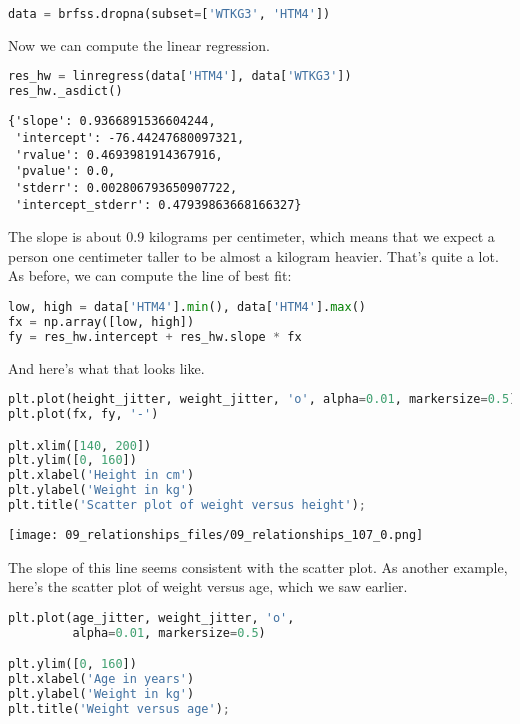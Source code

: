 \begin{lstlisting}[language=Python,style=source]
data = brfss.dropna(subset=['WTKG3', 'HTM4'])
\end{lstlisting}

Now we can compute the linear regression.

\begin{lstlisting}[language=Python,style=source]
res_hw = linregress(data['HTM4'], data['WTKG3'])
res_hw._asdict()
\end{lstlisting}

\begin{lstlisting}[style=output]
{'slope': 0.9366891536604244,
 'intercept': -76.44247680097321,
 'rvalue': 0.4693981914367916,
 'pvalue': 0.0,
 'stderr': 0.002806793650907722,
 'intercept_stderr': 0.47939863668166327}
\end{lstlisting}

The slope is about 0.9 kilograms per centimeter, which means that we
expect a person one centimeter taller to be almost a kilogram heavier.
That's quite a lot. As before, we can compute the line of best fit:

\begin{lstlisting}[language=Python,style=source]
low, high = data['HTM4'].min(), data['HTM4'].max()
fx = np.array([low, high])
fy = res_hw.intercept + res_hw.slope * fx
\end{lstlisting}

And here's what that looks like.

\begin{lstlisting}[language=Python,style=source]
plt.plot(height_jitter, weight_jitter, 'o', alpha=0.01, markersize=0.5)
plt.plot(fx, fy, '-')

plt.xlim([140, 200])
plt.ylim([0, 160])
plt.xlabel('Height in cm')
plt.ylabel('Weight in kg')
plt.title('Scatter plot of weight versus height');
\end{lstlisting}

\begin{center}
\texttt{[image: 09\_relationships\_files/09\_relationships\_107\_0.png]}
\end{center}

The slope of this line seems consistent with the scatter plot. As
another example, here's the scatter plot of weight versus age, which we
saw earlier.

\begin{lstlisting}[language=Python,style=source]
plt.plot(age_jitter, weight_jitter, 'o',
         alpha=0.01, markersize=0.5)

plt.ylim([0, 160])
plt.xlabel('Age in years')
plt.ylabel('Weight in kg')
plt.title('Weight versus age');
\end{lstlisting}

